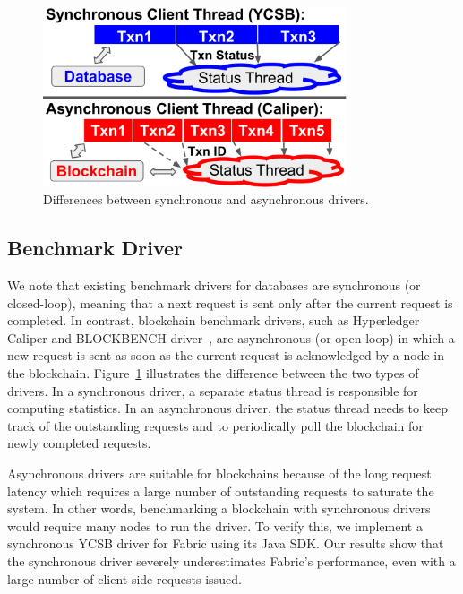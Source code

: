 \begin{figure}
	\centering
	\includegraphics[width=0.8\textwidth]{diagram/twin/driver_diff.pdf}
	\caption{Differences between synchronous and asynchronous drivers. }
	\label{diagram:twin:driver_diff} 
\end{figure}

\subsection{Benchmark Driver}
We note that existing benchmark drivers for databases are synchronous (or closed-loop), meaning that a next
request is sent only after the current request is completed. In contrast, blockchain benchmark
drivers, such as Hyperledger Caliper and BLOCKBENCH driver~\cite{dinh2017blockbench}, are asynchronous (or
open-loop) in which a new request is sent as soon as the current request is acknowledged by a
node in the blockchain. 
Figure~\ref{diagram:twin:driver_diff} illustrates the difference between the two types of drivers. 
In a synchronous driver, a separate status thread is responsible for computing statistics. In an
asynchronous driver, the status thread needs to keep track of the outstanding requests and to periodically poll
the blockchain for newly completed requests.

Asynchronous drivers are suitable for blockchains because of the long request latency which requires a large number of outstanding requests to saturate the system. In other words, benchmarking a blockchain with synchronous drivers would require many nodes to run the driver. 
To verify this, we implement a synchronous YCSB driver for Fabric using its Java SDK.  
Our results show that the synchronous driver severely underestimates Fabric's performance, even with a large number of client-side requests issued.

